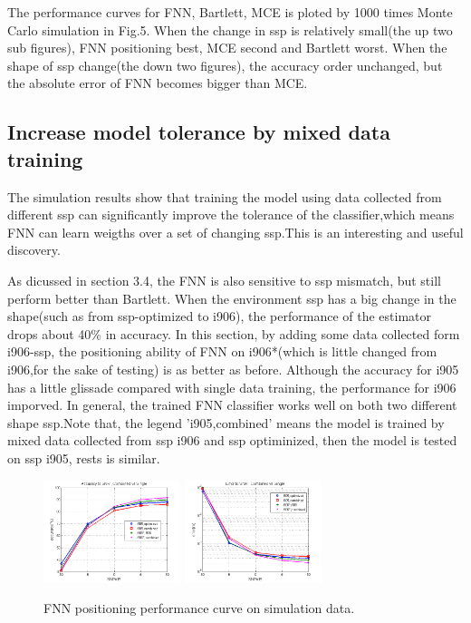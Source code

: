  The performance curves for FNN, Bartlett, MCE is ploted by 1000 times Monte Carlo simulation in Fig.5. When the change in ssp is relatively small(the up two sub figures), FNN positioning best, MCE second and Bartlett worst. 
 When the shape of ssp change(the down two figures), the accuracy order unchanged, but the absolute error of FNN becomes bigger than MCE.


\subsection{%
Increase model tolerance by mixed data training}
The simulation results show that training the model using data collected from different ssp can significantly improve the tolerance of the classifier,which means FNN can learn weigths over a set of changing ssp.This is an interesting and useful discovery.


As dicussed in section 3.4, the FNN is also sensitive to ssp mismatch, but still perform better than Bartlett. When the environment ssp has a big change in the shape(such as from ssp-optimized to i906), the performance of the estimator drops about 40\% in accuracy. In this section, by adding some data collected form i906-ssp, the positioning ability of FNN on i906{*}(which is little changed from i906,for the sake of testing) is as better as before. Although the accuracy for i905 has a little glissade compared with single data training, the performance for i906 imporved. In general, the trained FNN classifier works well on both two different shape ssp.Note that, the legend 'i905,combined' means the model is trained by mixed data collected from ssp i906 and ssp optiminized, then the model is tested on ssp i905, rests is similar.

\begin{figure}
\includegraphics[width=4cm,height=3cm]{figure/Accuracy_to_SNR_Combined_vs_Single}
\includegraphics[width=4cm,height=3cm]{figure/Error_to_SNR_Combined_vs_Single}
\caption{FNN positioning performance curve on simulation data.}
\end{figure}

